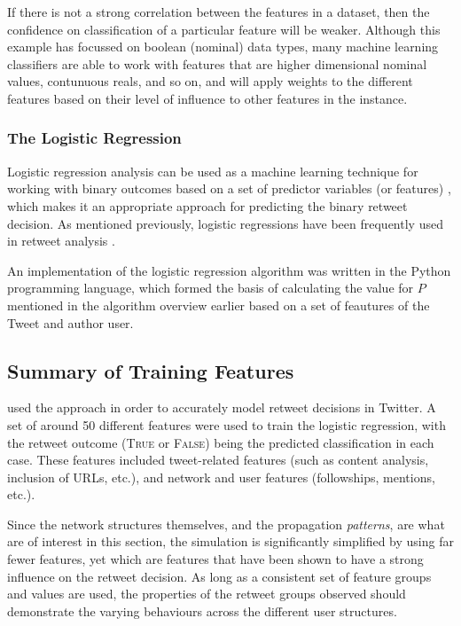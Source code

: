 If there is not a strong correlation between the features in a dataset, then the confidence on classification of a particular feature will be weaker. Although this example has focussed on boolean (nominal) data types, many machine learning classifiers are able to work with features that are higher dimensional nominal values, contunuous reals, and so on, and will apply weights to the different features based on their level of influence to other features in the instance.


\subsubsection{The Logistic Regression}
Logistic regression analysis can be used as a machine learning technique for working with binary outcomes based on a set of predictor variables (or features) \cite{hosmer13}, which makes it an appropriate approach for predicting the binary retweet decision. As mentioned previously, logistic regressions have been frequently used in retweet analysis \cite{castillo11} \cite{zhu11} \cite{peng11} \cite{naveed11} \cite{hong11}.

An implementation of the logistic regression algorithm was written in the Python programming language, which formed the basis of calculating the value for $P$ mentioned in the algorithm overview earlier based on a set of feautures of the Tweet and author user.


\subsection{Summary of Training Features}
\cite{zhu11} used the approach in order to accurately model retweet decisions in Twitter. A set of around 50 different features were used to train the logistic regression, with the retweet outcome (\textsc{True} or \textsc{False}) being the predicted classification in each case. These features included tweet-related features (such as content analysis, inclusion of URLs, etc.), and network and user features (followships, mentions, etc.).

Since the network structures themselves, and the propagation \textit{patterns}, are what are of interest in this section, the simulation is significantly simplified by using far fewer features, yet which are features that have been shown to have a strong influence on the retweet decision. As long as a consistent set of feature groups and values are used, the properties of the retweet groups observed should demonstrate the varying behaviours across the different user structures.

